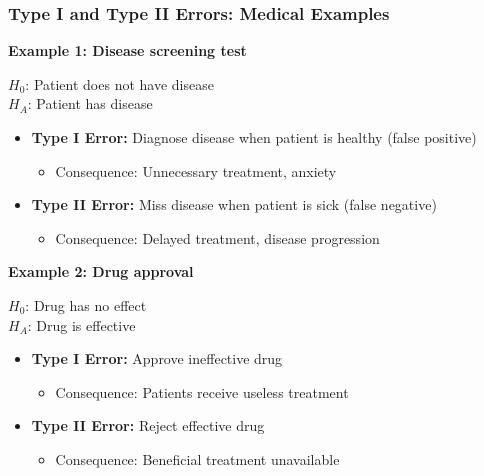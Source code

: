 \documentclass{beamer}
\begin{document}
\begin{frame}
\frametitle{Type I and Type II Errors: Medical Examples}
\textbf{Example 1: Disease screening test}

\vspace{0.15cm}
$H_0$: Patient does not have disease\\
$H_A$: Patient has disease

\vspace{0.15cm}
\begin{itemize}
\item \textbf{Type I Error:} Diagnose disease when patient is healthy (false positive)
  \begin{itemize}
  \item Consequence: Unnecessary treatment, anxiety
  \end{itemize}
\item \textbf{Type II Error:} Miss disease when patient is sick (false negative)
  \begin{itemize}
  \item Consequence: Delayed treatment, disease progression
  \end{itemize}
\end{itemize}

\vspace{0.2cm}
\textbf{Example 2: Drug approval}

\vspace{0.15cm}
$H_0$: Drug has no effect\\
$H_A$: Drug is effective

\vspace{0.15cm}
\begin{itemize}
\item \textbf{Type I Error:} Approve ineffective drug
  \begin{itemize}
  \item Consequence: Patients receive useless treatment
  \end{itemize}
\item \textbf{Type II Error:} Reject effective drug
  \begin{itemize}
  \item Consequence: Beneficial treatment unavailable
  \end{itemize}
\end{itemize}
\end{frame}
\end{document}
